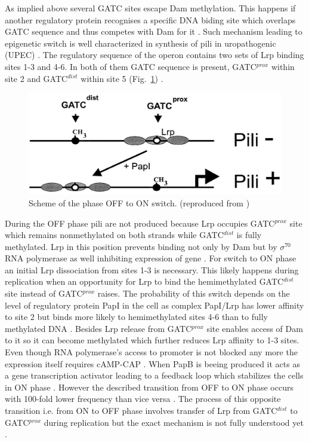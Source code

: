 As implied above several GATC sites escape Dam methylation.
This happens if another regulatory protein recognises a specific DNA biding site which overlaps GATC sequence and thus competes with Dam for it \cite{correnti2002dam}.
Such mechanism leading to epigenetic switch is well characterized in synthesis of  pili in uropathogenic  (UPEC) \cite{peterson2008competitive}.
The regulatory sequence of the  operon contains two sets of Lrp binding sites 1-3 and 4-6.
In both of them GATC sequence is present, GATC$^{prox}$ within site 2 and GATC$^{dist}$ within site 5 (Fig.~\ref{pap}) \cite{blyn1990regulation}.
\begin{figure}[h!]
  \centering
  \includegraphics[scale=0.3]{text/Pictures/papPili.png}
	\caption{Scheme of the  phase OFF to ON switch. (reproduced from \cite{low2001roles})}
	\label{pap}
\end{figure}
During the OFF phase  pili are not produced because Lrp occupies GATC$^{prox}$ site which remains nonmethylated on both strands while GATC$^{dist}$ is fully methylated.
Lrp in this position prevents binding not only by Dam but by $\sigma^{70}$ RNA polymerase as well inhibiting expression of  gene \cite{weyand2000regulation}.
For switch to ON phase an initial Lrp dissociation from sites 1-3 is necessary.
This likely happens during replication when an opportunity for Lrp to bind the hemimethylated GATC$^{dist}$ site instead of GATC$^{prox}$ raises.
The probability of this switch depends on the level of regulatory protein PapI in the cell as complex PapI/Lrp has lower affinity to site 2 but binds more likely to hemimethylated sites 4-6 than to fully methylated DNA \cite{hernday2003mechanism}.
Besides Lrp release from GATC$^{prox}$ site enables access of Dam to it so it can become methylated which further reduces Lrp affinity to 1-3 sites.
Even though RNA polymerase's access to  promoter is not blocked any more the expression itself requires cAMP-CAP \cite{weyand2001essential}.
When PapB is beeing produced it acts as a  gene transcription activator leading to a feedback loop which stabilizes the cells in ON phase \cite{forsman1989autoregulation}.
However the described transition from OFF to ON phase occurs with 100-fold lower frequency than vice versa \cite{blyn1990regulation}.
The process of this opposite transition i.e. from ON to OFF phase involves transfer of Lrp from GATC$^{dist}$ to GATC$^{prox}$ during replication but the exact mechanism is not fully understood yet \cite{adhikari2016dna}.

